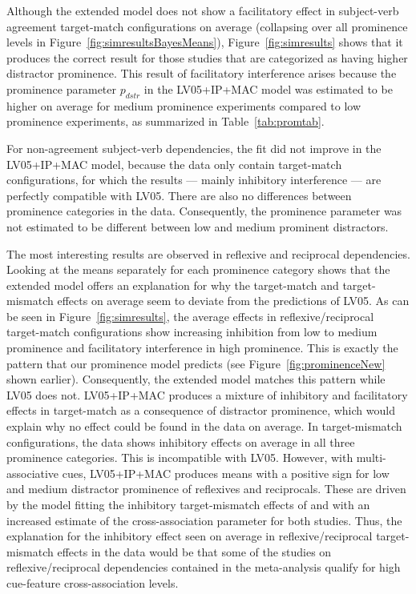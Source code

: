 \documentclass{cambridge7A}\usepackage[]{graphicx}\usepackage[]{color}
\begin{document}
Although the extended model does not show a facilitatory effect in  subject-verb agreement target-match configurations on average (collapsing over all prominence levels in Figure~\ref{fig:simresultsBayesMeans}), Figure~\ref{fig:simresults} shows that it produces the correct result for those studies that are categorized as having higher distractor prominence.
This result of facilitatory interference arises because the prominence parameter $p_{dstr}$ in the LV05+IP+MAC model was estimated to be higher on average for medium prominence experiments compared to low prominence experiments, as summarized in Table~\ref{tab:promtab}. 

For non-agreement subject-verb dependencies, the fit did not improve in the LV05+IP+MAC model, because the data only contain target-match configurations, for which the results --- mainly inhibitory interference --- are perfectly compatible with LV05. There are also no differences between prominence categories in the data. Consequently, the prominence parameter was not estimated to be different between low and medium prominent distractors.

The most interesting results are observed in  reflexive and reciprocal dependencies. 
Looking at the means separately for each prominence category shows that the extended model offers an explanation for why the target-match and target-mismatch effects on average seem to deviate from the predictions of LV05.
As can be seen in Figure~\ref{fig:simresults}, the average effects in reflexive/reciprocal target-match configurations show increasing inhibition from low to medium prominence and facilitatory interference in high prominence. This is exactly the pattern that our prominence model predicts (see Figure~\ref{fig:prominenceNew} shown earlier). Consequently, the extended model matches this pattern while LV05 does not.
LV05+IP+MAC produces a mixture of inhibitory and facilitatory effects in target-match as a consequence of distractor prominence, which would explain why no effect could be found in the data on average.
In target-mismatch configurations, the data shows inhibitory effects on average in all three prominence categories. This is incompatible with LV05. 
However, with multi-associative cues, LV05+IP+MAC produces means with a positive sign for low and medium distractor prominence of reflexives and reciprocals. These are driven by the model fitting the inhibitory target-mismatch effects of \cite{KushPhillips2014} and \cite{JaegerEngelmannVasishth2015} with an increased estimate of the cross-association parameter for both studies. 
Thus, the explanation for the inhibitory effect seen on average in reflexive/reciprocal target-mismatch effects in the data would be that some of the studies on reflexive/reciprocal dependencies contained in the meta-analysis qualify for high cue-feature cross-association levels.
\end{document}
